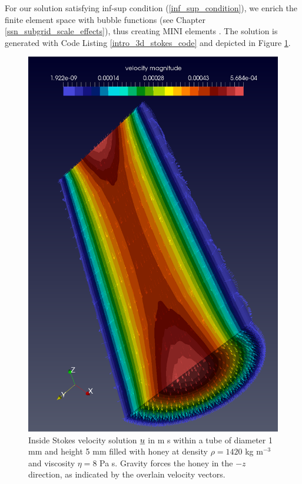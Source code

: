 For our solution satisfying inf-sup condition (\ref{inf_sup_condition}), we enrich the finite element space with bubble functions (see Chapter \ref{ssn_subgrid_scale_effects}), thus creating MINI elements \citep{arnold_1984}.  The solution is generated with Code Listing \ref{intro_3d_stokes_code} and depicted in Figure \ref{intro_3d_stokes_image}.


\begin{figure}
  \centering
    \includegraphics[width=0.8\linewidth]{images/fenics_intro/3Dstokes_new.png}
  \caption[Three-dimensional-no-slip Stokes example]{Inside Stokes velocity solution $\underline{u}$ in m s within a tube of diameter 1 mm and height 5 mm filled with honey at density $\rho = 1420$ kg m$^{-3}$ and viscosity $\eta = 8$ Pa s.  Gravity forces the honey in the $-z$ direction, as indicated by the overlain velocity vectors.}
  \label{intro_3d_stokes_image}
\end{figure}
